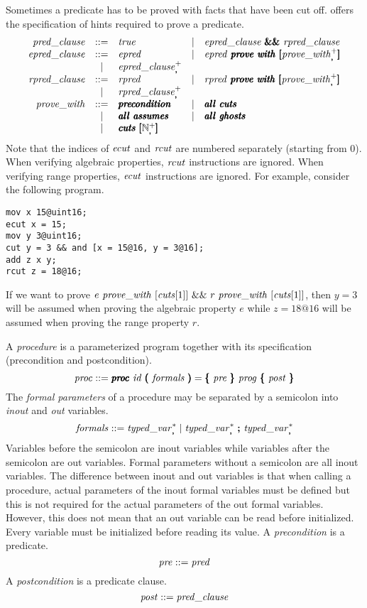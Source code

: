 \documentclass{article}
\begin{document}
Sometimes a predicate has to be proved with facts that have been cut off.
\cryptoline offers the specification of hints required to prove a predicate.
\[
\begin{array}{rclcl}
  \predclause &  ::= & \true %
              & \mid & \epredclause\ \pmb{\&\&}\ \rpredclause \\
  \epredclause &  ::= & \epred %
              & \mid & \epred\ \pmb\iprove\ \pmb\iwith\ \pmb[
                       \provewith_{\pmb,}^+ \pmb] \\
              & \mid & \epredclause_{\pmb,}^+ \\
  \rpredclause &  ::= & \rpred %
              & \mid & \rpred\ \pmb\iprove\ \pmb\iwith\ \pmb[
                       \provewith_{\pmb,}^+ \pmb]\\
  & \mid & \rpredclause_{\pmb,}^+ \\
  \provewith &  ::= & \pmb\precondition %
              & \mid & \pmb\all\ \pmb\cuts \\
              & \mid & \pmb\all\ \pmb\assumes %
              & \mid & \pmb\all\ \pmb\ghosts \\
              & \mid & \pmb\cuts\ \pmb[ \mN_{\pmb,}^+ \pmb]
\end{array}
\]
Note that the indices of $\mathit{ecut}$ and $\mathit{rcut}$ are numbered separately
(starting from 0).
When verifying algebraic properties, $\mathit{rcut}$ instructions are
ignored.
When verifying range properties, $\mathit{ecut}$ instructions are
ignored.
For example, consider the following program.
\begin{verbatim}
mov x 15@uint16;
ecut x = 15;
mov y 3@uint16;
cut y = 3 && and [x = 15@16, y = 3@16];
add z x y;
rcut z = 18@16;
\end{verbatim}
If we want to prove $e\ \mathit{prove\_with}\ [\mathit{cuts} [1]]\ \&\&\ r\ \mathit{prove\_with}\
[\mathit{cuts} [1]]$, then $y = 3$ will be assumed when proving the algebraic
property $e$ while $z = 18@16$ will be assumed when proving the range
property $r$.

A \emph{procedure} is a parameterized program together with its
specification (precondition and postcondition).
\[
\mathit{proc} ::= \pmb{\mathit{proc}}\ \mathit{id}\ \pmb{(}\ \mathit{formals}\ \pmb{)} = \pmb\{\ \mathit{pre}\ \pmb\}\ \mathit{prog}\ \pmb\{\ \mathit{post}\ \pmb\}
\]
The \emph{formal parameters} of a procedure may be separated by a
semicolon into \emph{inout} and \emph{out} variables.
\[
\mathit{formals} ::= \mathit{typed\_var}_{\pmb,}^* \mid \mathit{typed\_var}_{\pmb,}^*\ \pmb{;}\ \mathit{typed\_var}_{\pmb,}^*
\]
Variables before the semicolon are inout variables while variables
after the semicolon are out variables.
Formal parameters without a semicolon are all inout variables.
The difference between inout and out variables is that when calling a
procedure, actual parameters of the inout formal variables must be
defined but this is not required for the actual parameters of the out
formal variables.
However, this does not mean that an out variable can be read before
initialized.
Every variable must be initialized before reading its value.
A \emph{precondition} is a predicate.
\[
\mathit{pre} ::= \mathit{pred}
\]
A \emph{postcondition} is a predicate clause.
\[
\mathit{post} ::= \mathit{pred\_clause}
\]
\end{document}
